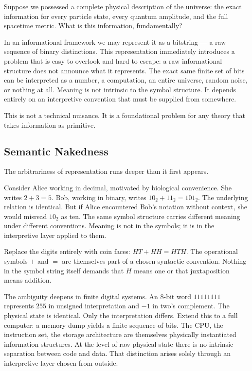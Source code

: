Suppose we possessed a complete physical description of the universe:
the exact information for every particle state, every quantum amplitude,
and the full spacetime metric. What is this information, fundamentally?

In an informational framework we may represent it as a bitstring --- a
raw sequence of binary distinctions. This representation immediately
introduces a problem that is easy to overlook and hard to escape: a raw
informational structure does not announce what it represents. The exact
same finite set of bits can be interpreted as a number, a computation,
an entire universe, random noise, or nothing at all. Meaning is not
intrinsic to the symbol structure. It depends entirely on an
interpretive convention that must be supplied from somewhere.

This is not a technical nuisance. It is a foundational problem for any
theory that takes information as primitive.

\subsection*{Semantic Nakedness}

The arbitrariness of representation runs deeper than it first appears.

Consider Alice working in decimal, motivated by biological convenience.
She writes $2 + 3 = 5$. Bob, working in binary, writes
$10_2 + 11_2 = 101_2$. The underlying relation is identical. But if
Alice encountered Bob's notation without context, she would misread
$10_2$ as ten. The same symbol structure carries different meaning
under different conventions. Meaning is not in the symbols; it is in
the interpretive layer applied to them.

Replace the digits entirely with coin faces: $HT + HH = HTH$. The
operational symbols $+$ and $=$ are themselves part of a chosen
syntactic convention. Nothing in the symbol string itself demands that
$H$ means one or that juxtaposition means addition.

The ambiguity deepens in finite digital systems. An 8-bit word
$11111111$ represents $255$ in unsigned interpretation and $-1$ in
two's complement. The physical state is identical. Only the
interpretation differs. Extend this to a full computer: a memory dump
yields a finite sequence of bits. The CPU, the instruction set, the
storage architecture are themselves physically instantiated information
structures. At the level of raw physical state there is no intrinsic
separation between code and data. That distinction arises solely
through an interpretive layer chosen from outside.

